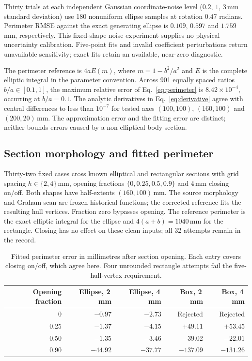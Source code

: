 \documentclass[11pt,a4paper]{article}
\begin{document}
Thirty trials at each independent Gaussian coordinate-noise level ($0.2$, $1$, $3$\,mm standard deviation) use 180 nonuniform ellipse samples at rotation $0.47$ radians. Perimeter RMSE against the exact generating ellipse is $0.109$, $0.597$ and $1.759$\,mm, respectively. This fixed-shape noise experiment supplies no physical uncertainty calibration. Five-point fits and invalid coefficient perturbations return unavailable sensitivity; exact fits retain an available, near-zero diagnostic.

The perimeter reference is $4aE(m)$, where $m=1-b^2/a^2$ and $E$ is the complete elliptic integral in the parameter convention. Across 901 equally spaced ratios $b/a\in[0.1,1]$, the maximum relative error of Eq.~\eqref{eq:perimeter} is $8.42\times10^{-4}$, occurring at $b/a=0.1$. The analytic derivatives in Eq.~\eqref{eq:derivative} agree with central differences to less than $10^{-7}$ for tested axes $(100,100)$, $(160,100)$ and $(200,20)$\,mm. The approximation error and the fitting error are distinct; neither bounds errors caused by a non-elliptical body section.

\subsection{Section morphology and fitted perimeter}
Thirty-two fixed cases cross known elliptical and rectangular sections with grid spacing $h\in\{2,4\}$\,mm, opening fractions $\{0,0.25,0.5,0.9\}$ and 4\,mm closing on/off. Both shapes have half-extents $(160,100)$\,mm. The source morphology and Graham scan are frozen historical functions; the corrected reference fits the resulting hull vertices. Fraction zero bypasses opening. The reference perimeter is the exact elliptic integral for the ellipse and $4(a+b)=1040$\,mm for the rectangle. Closing has no effect on these clean inputs; all 32 attempts remain in the record.

\begin{table}[htbp]
\centering
\caption{Fitted perimeter error in millimetres after section opening. Each entry covers closing on/off, which agree here. Four unrounded rectangle attempts fail the five-hull-vertex requirement.}
\label{tab:morphology}
\small
\begin{tabular}{rrrrr}
\toprule
Opening fraction & Ellipse, 2\,mm & Ellipse, 4\,mm & Box, 2\,mm & Box, 4\,mm\\
\midrule
0    &$-0.97$&$-2.73$&Rejected&Rejected\\
0.25 &$-1.37$&$-4.15$&$+49.11$&$+53.45$\\
0.50 &$-1.35$&$-3.46$&$-39.02$&$-22.01$\\
0.90 &$-44.92$&$-37.77$&$-137.09$&$-131.26$\\
\bottomrule
\end{tabular}
\end{table}
\end{document}
